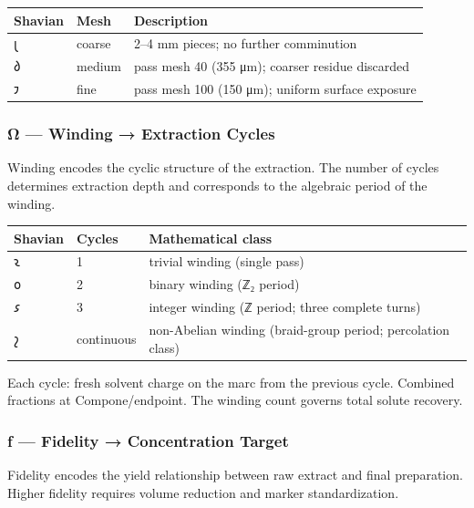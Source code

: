 \documentclass[12pt,a4paper]{article}
\begin{document}
\begin{longtable}[]{@{}lll@{}}
\toprule
Shavian & Mesh & Description\tabularnewline
\midrule
\endhead
𐑚 & coarse & 2--4 mm pieces; no further comminution\tabularnewline
𐑔 & medium & pass mesh 40 (355 μm); coarser residue
discarded\tabularnewline
𐑲 & fine & pass mesh 100 (150 μm); uniform surface
exposure\tabularnewline
\bottomrule
\end{longtable}

\hypertarget{ux3c9-winding-extraction-cycles}{%
\subsubsection{Ω --- Winding → Extraction
Cycles}\label{ux3c9-winding-extraction-cycles}}

Winding encodes the cyclic structure of the extraction. The number of
cycles determines extraction depth and corresponds to the algebraic
period of the winding.

\begin{longtable}[]{@{}lll@{}}
\toprule
Shavian & Cycles & Mathematical class\tabularnewline
\midrule
\endhead
𐑷 & 1 & trivial winding (single pass)\tabularnewline
𐑴 & 2 & binary winding (ℤ₂ period)\tabularnewline
𐑭 & 3 & integer winding (ℤ period; three complete turns)\tabularnewline
𐑟 & continuous & non-Abelian winding (braid-group period; percolation
class)\tabularnewline
\bottomrule
\end{longtable}

Each cycle: fresh solvent charge on the marc from the previous cycle.
Combined fractions at Compone/endpoint. The winding count governs total
solute recovery.

\hypertarget{ux192-fidelity-concentration-target}{%
\subsubsection{ƒ --- Fidelity → Concentration
Target}\label{ux192-fidelity-concentration-target}}

Fidelity encodes the yield relationship between raw extract and final
preparation. Higher fidelity requires volume reduction and marker
standardization.
\end{document}
